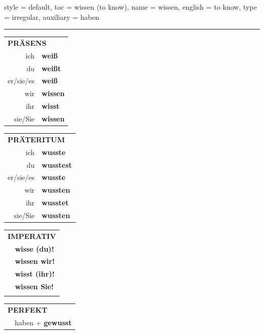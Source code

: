 \begin{verbentry}{
  style = {default},
  toc = {wissen (to know)},
  name = {wissen},
  english = {to know},
  type = {irregular},
  auxiliary = {haben}
}
 
    
     \vspace{5pt}

    \hrule
    
    \vspace{5pt}

  \begin{tabular}{rl}
     \multicolumn{2}{l}{\textbf{PRÄSENS} }\\
    ich & \textbf{weiß}\\
    du & \textbf{weißt}\\
    er/sie/es & \textbf{weiß}\\
    wir & \textbf{wissen}\\
    ihr & \textbf{wisst}\\
    sie/Sie & \textbf{wissen}\\
  \end{tabular}
  \hfill
     \begin{tabular}{rl}
    \multicolumn{2}{l}{\textbf{PRÄTERITUM} }\\
    ich & \textbf{wusste}\\
    du & \textbf{wusstest}\\
    er/sie/es & \textbf{wusste}\\
    wir & \textbf{wussten}\\
    ihr & \textbf{wusstet}\\
    sie/Sie & \textbf{wussten}\\
  \end{tabular}
  \hfill
  \begin{tabular}{rl}
     \multicolumn{2}{l}{\textbf{IMPERATIV} }\\
   & \textbf{wisse (du)!}\\
   & \textbf{wissen wir!}\\
   & \textbf{wisst (ihr)!}\\
   & \textbf{wissen Sie!}\\
   & \vspace{10pt}
  \end{tabular}

    \vspace{10pt}

 \begin{tabular}{rl}
     \multicolumn{2}{l}{\textbf{PERFEKT}}\\
  &  haben + \textbf{gewusst}\\
  \end{tabular}
\hfill
   \begin{tabular}{rl}
   

\end{tabular}
\end{verbentry}
